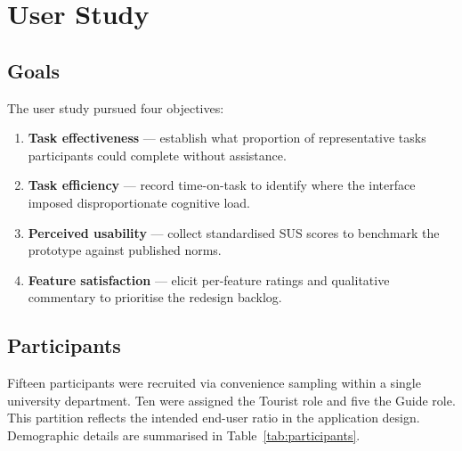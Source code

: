 \section{User Study}
\label{sec:study}

\subsection{Goals}
\label{sec:goals}

The user study pursued four objectives:

\begin{enumerate}
  \item \textbf{Task effectiveness} — establish what proportion of representative tasks
        participants could complete without assistance.
  \item \textbf{Task efficiency} — record time-on-task to identify where the interface
        imposed disproportionate cognitive load.
  \item \textbf{Perceived usability} — collect standardised SUS scores to benchmark
        the prototype against published norms.
  \item \textbf{Feature satisfaction} — elicit per-feature ratings and qualitative
        commentary to prioritise the redesign backlog.
\end{enumerate}

\subsection{Participants}
\label{sec:participants}

Fifteen participants were recruited via convenience sampling within a single university
department. Ten were assigned the Tourist role and five the Guide role. This partition
reflects the intended end-user ratio in the application design. Demographic details are
summarised in Table~\ref{tab:participants}.

